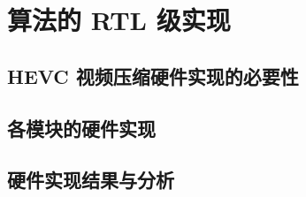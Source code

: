\chapter{算法的 RTL 级实现}
\label{cha:c4}

\section{HEVC 视频压缩硬件实现的必要性}

\section{各模块的硬件实现}

\section{硬件实现结果与分析}